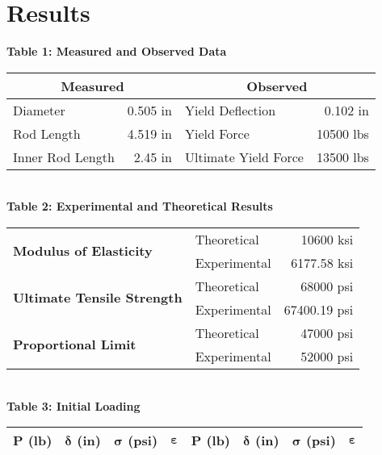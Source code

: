 \documentclass{article}
\begin{document}
    \section{Results}
    \begin{center}
    {\large{\bf Table 1: Measured and Observed Data\\}}
    \vspace{3mm}
    \begin{tabular}{| l r | l r |}
        \hline
        \multicolumn{2}{|c|}{\textbf{Measured}} & \multicolumn{2}{|c|}{\textbf{Observed}} \\ \hline
        Diameter & 0.505 in & Yield Deflection & 0.102 in \\
        Rod Length & 4.519 in & Yield Force & 10500 lbs \\
        Inner Rod Length & 2.45 in & Ultimate Yield Force & 13500 lbs \\ \hline
    \end{tabular}
    \vspace{10mm}
    {\large{\bf \\Table 2: Experimental and Theoretical Results\\}}
    \vspace{3mm}
    \begin{tabular}{|l | l r |}
        \hline
        \multirow{2}{*}{\textbf{Modulus of Elasticity}} & Theoretical & 10600 ksi\\
        & Experimental & 6177.58 ksi \\\hline
        \multirow{2}{*}{\textbf{Ultimate Tensile Strength}} & Theoretical & 68000 psi\\
        & Experimental & 67400.19 psi \\\hline
        \multirow{2}{*}{\textbf{Proportional Limit}} & Theoretical & 47000 psi\\
        & Experimental & 52000 psi \\\hline
    \end{tabular}
    \vspace{10 mm}
    {\large{\bf \\Table 3: Initial Loading\\}}
    \vspace{3mm}
    \begin{tabular}{|c c c c||c c c c|}
        \hline
        \textbf{P (lb)} & \(\bm{\delta}\)\textbf{ (in)} & \(\bm{\sigma}\)\textbf{ (psi)} & \(\bm{\varepsilon}\) & \textbf{P (lb)} & \(\bm{\delta}\)\textbf{ (in)} & \(\bm{\sigma}\)\textbf{ (psi)} & \(\bm{\varepsilon}\)\\ \hline

\end{tabular}
\end{center}
\end{document}
